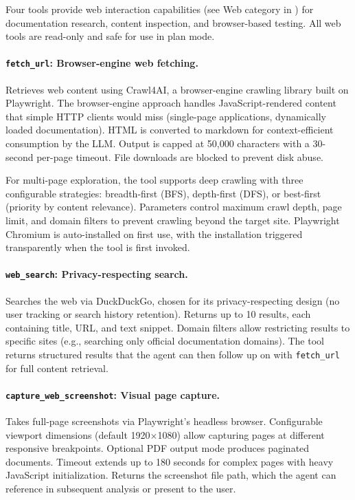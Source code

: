 Four tools provide web interaction capabilities (see Web category in ) for documentation research, content inspection, and browser-based testing. All web tools are read-only and safe for use in plan mode.

\paragraph{\texttt{fetch\_url}: Browser-engine web fetching.} Retrieves web content using Crawl4AI, a browser-engine crawling library built on Playwright. The browser-engine approach handles JavaScript-rendered content that simple HTTP clients would miss (single-page applications, dynamically loaded documentation). HTML is converted to markdown for context-efficient consumption by the LLM. Output is capped at 50,000 characters with a 30-second per-page timeout. File downloads are blocked to prevent disk abuse.

For multi-page exploration, the tool supports deep crawling with three configurable strategies: breadth-first (BFS), depth-first (DFS), or best-first (priority by content relevance). Parameters control maximum crawl depth, page limit, and domain filters to prevent crawling beyond the target site. Playwright Chromium is auto-installed on first use, with the installation triggered transparently when the tool is first invoked.

\paragraph{\texttt{web\_search}: Privacy-respecting search.} Searches the web via DuckDuckGo, chosen for its privacy-respecting design (no user tracking or search history retention). Returns up to 10 results, each containing title, URL, and text snippet. Domain filters allow restricting results to specific sites (e.g., searching only official documentation domains). The tool returns structured results that the agent can then follow up on with \texttt{fetch\_url} for full content retrieval.

\paragraph{\texttt{capture\_web\_screenshot}: Visual page capture.} Takes full-page screenshots via Playwright's headless browser. Configurable viewport dimensions (default 1920$\times$1080) allow capturing pages at different responsive breakpoints. Optional PDF output mode produces paginated documents. Timeout extends up to 180 seconds for complex pages with heavy JavaScript initialization. Returns the screenshot file path, which the agent can reference in subsequent analysis or present to the user.

